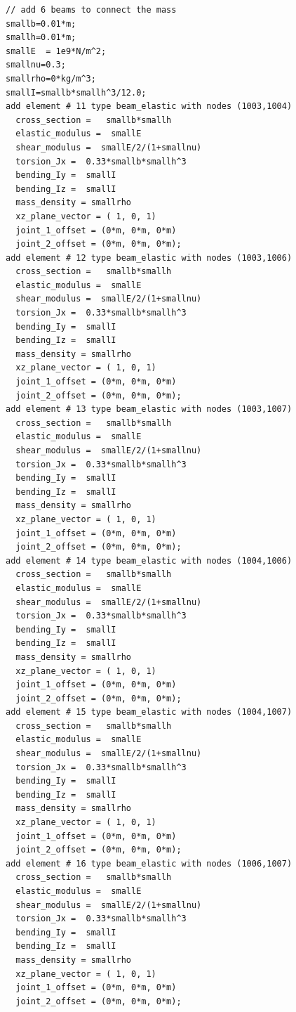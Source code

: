 \begin{lstlisting}
// add 6 beams to connect the mass 
smallb=0.01*m;
smallh=0.01*m;
smallE  = 1e9*N/m^2; 
smallnu=0.3;
smallrho=0*kg/m^3;
smallI=smallb*smallh^3/12.0;
add element # 11 type beam_elastic with nodes (1003,1004) 
  cross_section =   smallb*smallh 
  elastic_modulus =  smallE
  shear_modulus =  smallE/2/(1+smallnu)
  torsion_Jx =  0.33*smallb*smallh^3
  bending_Iy =  smallI
  bending_Iz =  smallI
  mass_density = smallrho
  xz_plane_vector = ( 1, 0, 1) 
  joint_1_offset = (0*m, 0*m, 0*m) 
  joint_2_offset = (0*m, 0*m, 0*m);
add element # 12 type beam_elastic with nodes (1003,1006) 
  cross_section =   smallb*smallh 
  elastic_modulus =  smallE
  shear_modulus =  smallE/2/(1+smallnu)
  torsion_Jx =  0.33*smallb*smallh^3
  bending_Iy =  smallI
  bending_Iz =  smallI
  mass_density = smallrho
  xz_plane_vector = ( 1, 0, 1) 
  joint_1_offset = (0*m, 0*m, 0*m) 
  joint_2_offset = (0*m, 0*m, 0*m);
add element # 13 type beam_elastic with nodes (1003,1007) 
  cross_section =   smallb*smallh 
  elastic_modulus =  smallE
  shear_modulus =  smallE/2/(1+smallnu)
  torsion_Jx =  0.33*smallb*smallh^3
  bending_Iy =  smallI
  bending_Iz =  smallI
  mass_density = smallrho
  xz_plane_vector = ( 1, 0, 1) 
  joint_1_offset = (0*m, 0*m, 0*m) 
  joint_2_offset = (0*m, 0*m, 0*m);
add element # 14 type beam_elastic with nodes (1004,1006) 
  cross_section =   smallb*smallh 
  elastic_modulus =  smallE
  shear_modulus =  smallE/2/(1+smallnu)
  torsion_Jx =  0.33*smallb*smallh^3
  bending_Iy =  smallI
  bending_Iz =  smallI
  mass_density = smallrho
  xz_plane_vector = ( 1, 0, 1) 
  joint_1_offset = (0*m, 0*m, 0*m) 
  joint_2_offset = (0*m, 0*m, 0*m);
add element # 15 type beam_elastic with nodes (1004,1007) 
  cross_section =   smallb*smallh 
  elastic_modulus =  smallE
  shear_modulus =  smallE/2/(1+smallnu)
  torsion_Jx =  0.33*smallb*smallh^3
  bending_Iy =  smallI
  bending_Iz =  smallI
  mass_density = smallrho
  xz_plane_vector = ( 1, 0, 1) 
  joint_1_offset = (0*m, 0*m, 0*m) 
  joint_2_offset = (0*m, 0*m, 0*m);
add element # 16 type beam_elastic with nodes (1006,1007) 
  cross_section =   smallb*smallh 
  elastic_modulus =  smallE
  shear_modulus =  smallE/2/(1+smallnu)
  torsion_Jx =  0.33*smallb*smallh^3
  bending_Iy =  smallI
  bending_Iz =  smallI
  mass_density = smallrho
  xz_plane_vector = ( 1, 0, 1) 
  joint_1_offset = (0*m, 0*m, 0*m) 
  joint_2_offset = (0*m, 0*m, 0*m);



\end{lstlisting}
